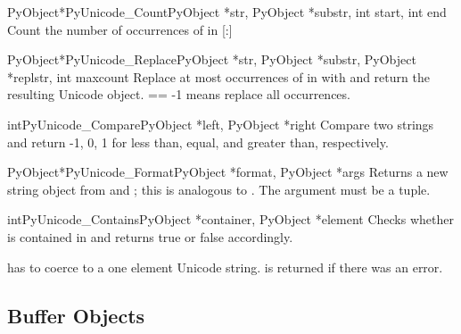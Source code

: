 \begin{cfuncdesc}{PyObject*}{PyUnicode_Count}{PyObject *str,
                                                  PyObject *substr,
                                                  int start,
                                                  int end}
  Count the number of occurrences of  in
  [:]
\end{cfuncdesc}

\begin{cfuncdesc}{PyObject*}{PyUnicode_Replace}{PyObject *str,
                                                PyObject *substr,
                                                PyObject *replstr,
                                                int maxcount}
  Replace at most  occurrences of  in
   with  and return the resulting Unicode object.
   == -1 means replace all occurrences.
\end{cfuncdesc}

\begin{cfuncdesc}{int}{PyUnicode_Compare}{PyObject *left, PyObject *right}
  Compare two strings and return -1, 0, 1 for less than, equal, and
  greater than, respectively.
\end{cfuncdesc}

\begin{cfuncdesc}{PyObject*}{PyUnicode_Format}{PyObject *format,
                                              PyObject *args}
  Returns a new string object from  and ; this
  is analogous to .  The
   argument must be a tuple.
\end{cfuncdesc}

\begin{cfuncdesc}{int}{PyUnicode_Contains}{PyObject *container,
                                           PyObject *element}
  Checks whether  is contained in  and
  returns true or false accordingly.

   has to coerce to a one element Unicode
  string.  is returned if there was an error.
\end{cfuncdesc}


\subsection{Buffer Objects \label{bufferObjects}}

